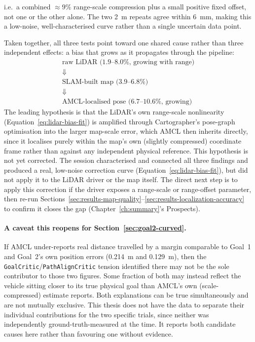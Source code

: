 i.e.\ a combined $\approx 9\%$ range-scale compression plus a small
positive fixed offset, not one or the other alone. The two
\SI{2}{\meter} repeats agree within \SI{6}{\milli\meter}, making this
a low-noise, well-characterised curve rather than a single uncertain
data point.

Taken together, all three tests point toward one shared cause rather
than three independent effects: a bias that grows as it propagates
through the pipeline:
\begin{gather*}
  \text{raw LiDAR (1.9--8.0\%, growing with range)} \\
  \Downarrow \\
  \text{SLAM-built map (3.9--6.8\%)} \\
  \Downarrow \\
  \text{AMCL-localised pose (6.7--10.6\%, growing)}
\end{gather*}
The leading hypothesis is that the LiDAR's own range-scale
nonlinearity (Equation~\ref{eq:lidar-bias-fit}) is amplified through
Cartographer's pose-graph optimisation into the larger map-scale
error, which AMCL then inherits directly, since it localises purely
within the map's own (slightly compressed) coordinate frame rather
than against any independent physical reference. This hypothesis is
not yet corrected. The session characterised and connected all
three findings and produced a real, low-noise correction curve
(Equation~\ref{eq:lidar-bias-fit}), but did not apply it to the LiDAR
driver or the map itself. The direct next step is to apply this
correction if the driver exposes a range-scale or range-offset
parameter, then re-run
Sections~\ref{sec:results-map-quality}--\ref{sec:results-localization-accuracy}
to confirm it closes the gap (Chapter~\ref{ch:summary}'s Prospects).

\paragraph{A caveat this reopens for Section~\ref{sec:goal2-curved}.}
If AMCL under-reports real distance travelled by a margin comparable
to Goal~1 and Goal~2's own position errors (\SI{0.214}{\meter} and
\SI{0.129}{\meter}), then the \texttt{GoalCritic}/\texttt{PathAlignCritic}
tension identified there may not be the sole contributor to those two
figures. Some fraction of both may instead reflect the vehicle
sitting closer to its true physical goal than AMCL's own
(scale-compressed) estimate reports. Both explanations can be true
simultaneously and are not mutually exclusive. This thesis does not
have the data to separate their individual contributions for the two
specific trials, since neither was independently
ground-truth-measured at the time. It reports both candidate causes
here rather than favouring one without evidence.

